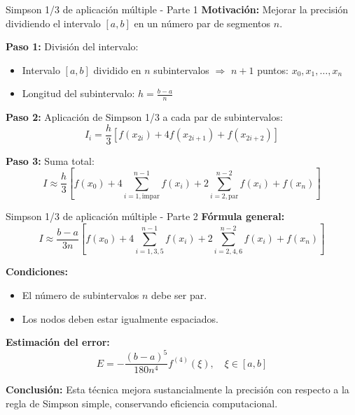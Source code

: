 \documentclass[main.tex]{subfiles}
\begin{document}
\begin{frame}{Simpson 1/3 de aplicación múltiple - Parte 1}
\textbf{Motivación:} Mejorar la precisión dividiendo el intervalo \([a, b]\) en un número par de segmentos \(n\).

\textbf{Paso 1:} División del intervalo:
\begin{itemize}
  \item Intervalo \([a, b]\) dividido en \(n\) subintervalos \(\Rightarrow\) \(n+1\) puntos: \(x_0, x_1, \ldots, x_n\)
  \item Longitud del subintervalo: \(h = \frac{b - a}{n}\)
\end{itemize}

\textbf{Paso 2:} Aplicación de Simpson 1/3 a cada par de subintervalos:
\[
I_i = \frac{h}{3} [f(x_{2i}) + 4f(x_{2i+1}) + f(x_{2i+2})]
\]

\textbf{Paso 3:} Suma total:
\[
I \approx \frac{h}{3} \left[f(x_0) + 4\sum_{i=1, \text{impar}}^{n-1} f(x_i) + 2\sum_{i=2, \text{par}}^{n-2} f(x_i) + f(x_n)\right]
\]
\end{frame}

\begin{frame}{Simpson 1/3 de aplicación múltiple - Parte 2}
\textbf{Fórmula general:}
\[
I \approx \frac{b - a}{3n} \left[f(x_0) + 4\sum_{i=1,3,5}^{n-1} f(x_i) + 2\sum_{i=2,4,6}^{n-2} f(x_i) + f(x_n)\right]
\]

\textbf{Condiciones:}
\begin{itemize}
  \item El número de subintervalos \(n\) debe ser par.
  \item Los nodos deben estar igualmente espaciados.
\end{itemize}

\textbf{Estimación del error:}
\[
E = -\frac{(b - a)^5}{180 n^4} f^{(4)}(\xi), \quad \xi \in [a, b]
\]

\textbf{Conclusión:} Esta técnica mejora sustancialmente la precisión con respecto a la regla de Simpson simple, conservando eficiencia computacional.
\end{frame}
\end{document}
